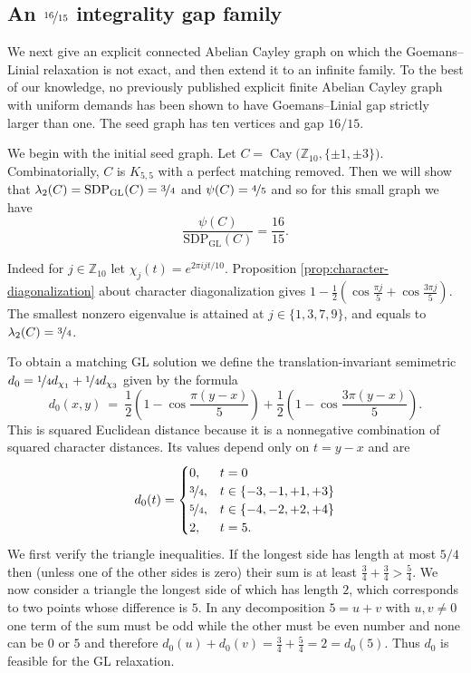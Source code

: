 \documentclass[11pt]{article}
\theoremstyle{definition}
\theoremstyle{remark}
\begin{document}
\subsection{An  $\nicefrac{16}{15}$ integrality gap family}\label{subsec:integrality}
We next give an explicit connected Abelian Cayley graph on which the Goemans–Linial relaxation is not exact, and then extend it to an infinite family. To the best of our knowledge, no previously published explicit finite Abelian Cayley graph with uniform demands has been shown to have Goemans–Linial gap strictly larger than one. The seed graph has ten vertices and gap $16/15$. 


We begin with the initial seed graph. Let $C=\operatorname{Cay}\bigl(\mathbb Z_{10},\{\pm1,\pm3\}\bigr)$. Combinatorially, $C$ is $K_{5,5}$ with a perfect matching removed. Then we will show that 
$\lambda_2(C)=\operatorname{SDP_{GL}}(C)=\nicefrac{3}{4}$ and $\psi(C)=\nicefrac{4}{5}$ and so for this small graph we have 
\[
\frac{\psi(C)}{\operatorname{SDP_{GL}}(C)}=\frac{16}{15}.
\]


Indeed for $j\in\mathbb Z_{10}$  let $\chi_j(t)=e^{2\pi ijt/10}$. Proposition \ref{prop:character-diagonalization} about character diagonalization gives $1-\frac12\left( \cos\frac{\pi j}{5} + \cos\frac{3\pi j}{5} \right)$. The smallest nonzero eigenvalue is attained at $j\in \{1,3,7,9\}$, and equals to $\lambda_2(C)=\nicefrac{3}{4}$.

To obtain a matching GL solution we define the translation-invariant semimetric $d_0 = \nicefrac{1}{4}d_{\chi_1} + \nicefrac{1}{4}d_{\chi_3}$ given by the formula
\[
d_0(x,y) ~=~ \frac{1}{2}\left(1-\cos\frac{\pi(y-x)}5\right)
+
\frac{1}{2}\left(1-\cos\frac{3\pi(y-x)}5\right).
\]
This is squared Euclidean distance because it is a nonnegative combination of squared character distances. Its values depend only on $t=y-x$ and are 
\[
d_0(t)=
\begin{cases}
0, & t=0 \\
\nicefrac{3}{4}, & t\in \{ -3,-1,+1,+3 \} \\
\nicefrac{5}{4}, & t\in \{-4,-2,+2,+4\} \\
2, & t=5.
\end{cases}
\]
We first verify the triangle inequalities. If the longest side has length at most $5/4$ then (unless one of the other sides is zero) their sum is at least $\frac34+\frac34>\frac54$. We now  consider a triangle the longest side of which has length $2$, which corresponds to two points whose difference is $5$. In any decomposition $5=u+v$ with $u,v\neq 0$ one term of the sum must be  odd while the other must be even number and none can be $0$ or $5$ and therefore $d_0(u)+d_0(v) = \frac34+\frac54=2 = d_0(5)$. Thus $d_0$ is feasible for the GL relaxation. 
\end{document}
